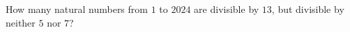 How many natural numbers from $1$ to $2024$ are divisible by $13$, but divisible by neither $5$ nor $7$?
